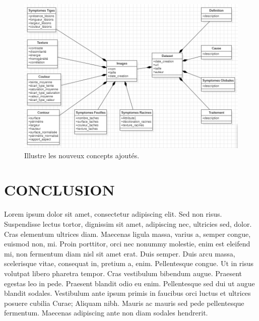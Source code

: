\begin{figure}[H]
	\begin{center}
		\begin{minipage}[b]{1\textwidth}
			\centering
			\includegraphics[width=\textwidth]{images/Diagramme.png}
		\end{minipage}
		\caption{Illustre les nouveux concepts ajoutés.}
	\end{center}
\end{figure}

\section{CONCLUSION}
Lorem ipsum dolor sit amet, consectetur adipiscing elit. Sed non risus. Suspendisse lectus tortor, dignissim sit amet, adipiscing nec, ultricies sed, dolor. Cras elementum ultrices diam. Maecenas ligula massa, varius a, semper congue, euismod non, mi. Proin porttitor, orci nec nonummy molestie, enim est eleifend mi, non fermentum diam nisl sit amet erat. Duis semper. Duis arcu massa, scelerisque vitae, consequat in, pretium a, enim. Pellentesque congue. Ut in risus volutpat libero pharetra tempor. Cras vestibulum bibendum augue. Praesent egestas leo in pede. Praesent blandit odio eu enim. Pellentesque sed dui ut augue blandit sodales. Vestibulum ante ipsum primis in faucibus orci luctus et ultrices posuere cubilia Curae; Aliquam nibh. Mauris ac mauris sed pede pellentesque fermentum. Maecenas adipiscing ante non diam sodales hendrerit.